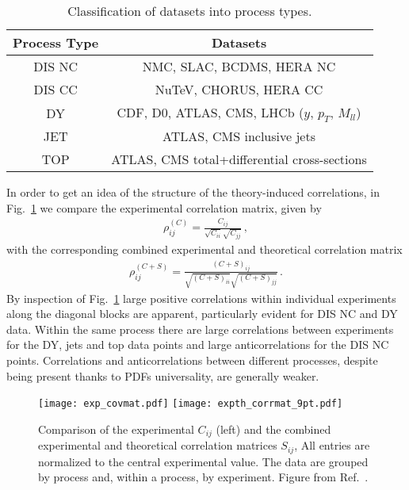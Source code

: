     \begin{table}[t]
        \centering
        \renewcommand*{\arraystretch}{1.3}
        \begin{tabular}{|c|c|}
          \hline
          Process Type  & Datasets \\
          \hline
          DIS NC  &   NMC, SLAC, BCDMS, HERA NC \\
          DIS CC  &   NuTeV, CHORUS, HERA CC \\
          DY  & CDF, D0, ATLAS, CMS, LHCb ($y$, $p_T$, $M_{ll}$) \\
          JET  & ATLAS, CMS inclusive jets \\
          TOP  & ATLAS, CMS total+differential cross-sections \\
          \hline
        \end{tabular}
        \caption{\label{eq:expclassification}
         Classification of  datasets into  process types.
        }
    \end{table}
    In order to get an idea of the structure of the theory-induced correlations,
    in Fig.~\ref{fig:covmats} we compare the experimental correlation matrix, given by
    \begin{align}
        \rho^{(C)}_{ij} = \frac{C_{ij}}{\sqrt{C_{ii}}\sqrt{C_{jj}}}\,,
    \end{align}
    with the corresponding combined experimental and theoretical correlation matrix
    \begin{align}
        \rho^{(C+S)}_{ij} = \frac{\left(C+S\right)_{ij}}{ \sqrt{\left(C+S\right)_{ii}} \sqrt{\left(C+S\right)_{jj}} }\,.
    \end{align}
    By inspection of Fig.~\ref{fig:covmats} large positive correlations within individual experiments along 
    the diagonal blocks are apparent, particularly evident for DIS NC and DY data.
    Within the same process there are large correlations between experiments for the DY, jets and top data points 
    and large anticorrelations for the DIS NC points. Correlations and anticorrelations between different processes,
    despite being present thanks to PDFs universality, are generally weaker.

    \begin{figure}[t!]
    \begin{center}
        \texttt{[image: exp\_covmat.pdf]}
        \texttt{[image: expth\_corrmat\_9pt.pdf]}
        \caption{\small Comparison of the  experimental $C_{ij}$ (left)
        and the combined experimental and theoretical correlation matrices $S_{ij}$, 
        All entries are normalized to the central  experimental value.
        The data are grouped by process and, within a process, by experiment. Figure from Ref.~\cite{AbdulKhalek:2019ihb}.} 
        \label{fig:covmats}     
    \end{center}
    \end{figure}

